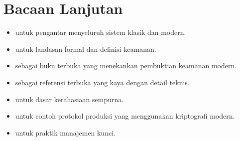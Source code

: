 \documentclass[../main.tex]{subfiles}
\begin{document}
\section{Bacaan Lanjutan}
\begin{itemize}
  \item \citep{stallings} untuk pengantar menyeluruh sistem klasik dan modern.
  \item \citep{katzlindell} untuk landasan formal dan definisi keamanan.
  \item \citep{bonehshoup} sebagai buku terbuka yang menekankan pembuktian keamanan modern.
  \item \citep{menezes} sebagai referensi terbuka yang kaya dengan detail teknis.
  \item \citep{shannon1949} untuk dasar kerahasiaan sempurna.
  \item \citep{rfc8446} untuk contoh protokol produksi yang menggunakan kriptografi modern.
  \item \citep{nist_sp_800_57pt1r5} untuk praktik manajemen kunci.
\end{itemize}
\end{document}
